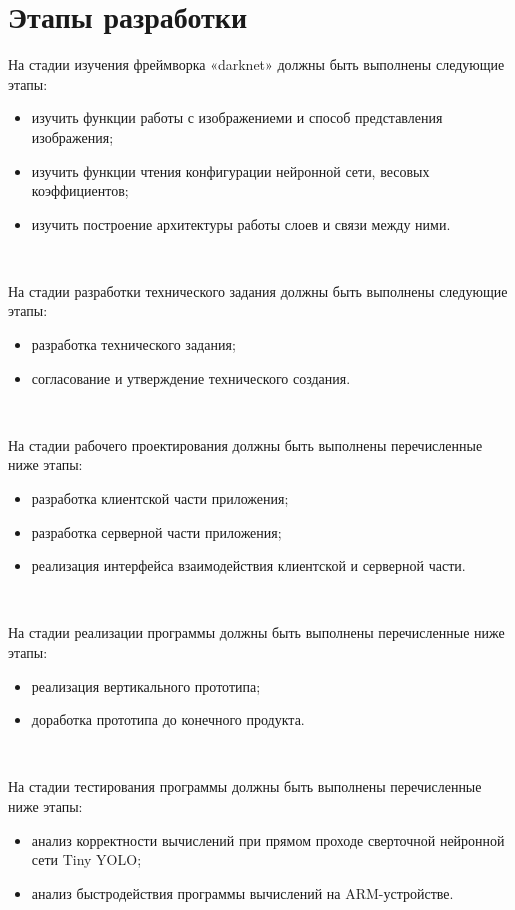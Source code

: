 \documentclass[a4paper,english]{G2-105}
\begin{document}
\section{Этапы разработки} \ttl
\par На стадии изучения фреймворка «darknet» должны быть
выполнены следующие этапы:
\begin{itemize}
\item изучить функции работы с изображениеми и способ
представления изображения;
\item изучить функции чтения конфигурации нейронной сети,
весовых коэффициентов;
\item изучить построение архитектуры работы слоев и связи между
ними.
\end{itemize}
~\                    
\par На стадии разработки технического задания должны быть
выполнены следующие этапы:
\begin{itemize}
\item разработка технического задания;
\item согласование и утверждение технического создания.
\end{itemize}
~\ 
\par На стадии рабочего проектирования должны быть выполнены
перечисленные ниже этапы:
\begin{itemize}
\item разработка клиентской части приложения;
\item разработка серверной части приложения;
\item реализация интерфейса взаимодействия клиентской и серверной части.
\end{itemize}
~\ 
\par На стадии реализации программы должны быть выполнены
перечисленные ниже этапы:
\begin{itemize}
\item реализация вертикального прототипа;
\item доработка прототипа до конечного продукта.
\end{itemize}
~\ 
\par На стадии тестирования программы должны быть выполнены
перечисленные ниже этапы:
\begin{itemize}
\item анализ корректности вычислений при прямом проходе сверточной нейронной сети Tiny YOLO;
\item анализ быстродействия программы вычислений на ARM-устройстве.
\end{itemize}
\ttl \ttl \ttl
\chaptertz{Порядок контроля и приемки} \ttl \ttl
\end{document}
